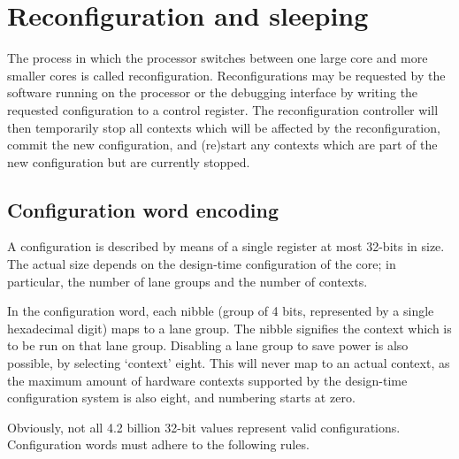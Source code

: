 
\clearpage
\section{Reconfiguration and sleeping}
\label{sec:core-ug-reconf}

The process in which the \rvex{} processor switches between one large core and
more smaller cores is called reconfiguration. Reconfigurations may be requested
by the software running on the processor or the debugging interface by writing
the requested configuration to a control register. The reconfiguration
controller will then temporarily stop all contexts which will be affected by the
reconfiguration, commit the new configuration, and (re)start any contexts which
are part of the new configuration but are currently stopped.

\subsection{Configuration word encoding}
\label{sec:core-ug-reconf-word}

A configuration is described by means of a single register at most 32-bits in
size. The actual size depends on the design-time configuration of the core; in
particular, the number of lane groups and the number of contexts.

In the configuration word, each nibble (group of 4 bits, represented by a single
hexadecimal digit) maps to a lane group. The nibble signifies the context which
is to be run on that lane group. Disabling a lane group to save power is also
possible, by selecting `context' eight. This will never map to an actual
context, as the maximum amount of hardware contexts supported by the design-time
configuration system is also eight, and numbering starts at zero.

Obviously, not all 4.2 billion 32-bit values represent valid configurations.
Configuration words must adhere to the following rules.

